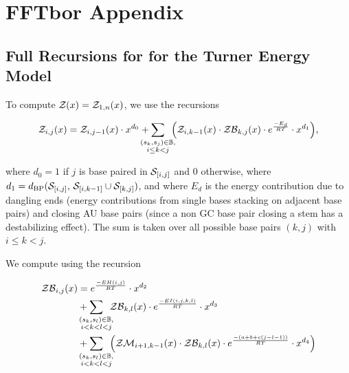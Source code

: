 
\chapter{FFTbor Appendix}
\label{ch:fftborapp}


\section{Full Recursions for \texorpdfstring{}{}
for the Turner Energy Model}
\label{sec:fftbor:turner}

To compute ${\mathcal Z}_{}(x) = {\mathcal Z}_{1,n}(x)$, we use the recursions

\begin{align}
\label{eq:fftborapp:zx}
\emZ{i,j} = \emZ{i,j-1} \cdot x^{d_0} +
\sum_{\mathclap{\substack{(s_k,s_j) \in \bpSet, \\ i \leq k < j}}}\enspace
\Big( \emZ{i,k-1} \cdot \emZB{k,j} \cdot \boltzE{E_d} \cdot x^{d_1} \Big),
\end{align}

where $d_0 = 1$ if $j$ is base paired
in $\mathcal S_{[i,j]}$ and $0$ otherwise, where $d_1 =
d_{\text{BP}}(\mathcal S_{[i,j]},\,\mathcal S_{[i,k-1]} \cup \mathcal S_{[k,j]})$, and
where $E_d$ is the energy contribution due to dangling ends (energy
contributions from single bases stacking on adjacent base pairs) and
closing AU base pairs (since a non GC base pair closing a stem has a
destabilizing effect).  The sum is taken over all possible
base pairs $(k,j)$ with $i \le k < j$.

We compute \emZB{} using the recursion

\begin{align}
\label{eq:fftborapp:zbx}
\begin{split}
\emZB{i,j} &= \boltzE{EH(i,j)} \cdot x^{d_2} \\
&+ \sum_{\mathclap{\substack{(s_k,s_l) \in \bpSet, \\ i < k < l < j }}}\enspace
\emZB{k,l} \cdot \boltzE{EI(i,j,k,l)} \cdot x^{d_3} \\
&+ \sum_{\mathclap{\substack{(s_k,s_l) \in \bpSet, \\ i < k < l < j }}}\enspace
\Big( \emZM{i+1,k-1} \cdot \emZB{k,l} \cdot \boltzE{(a+b+c(j-l-1))}
\cdot x^{d_4} \Big)
\end{split}
\end{align}

